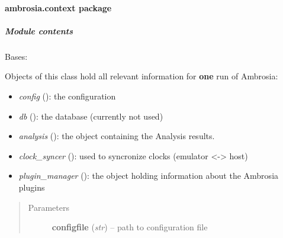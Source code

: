 \documentclass[letterpaper,10pt,english]{sphinxmanual}
\begin{document}
\paragraph{ambrosia.context package}
\label{ambrosia.context::doc}\label{ambrosia.context:ambrosia-context-package}

\subparagraph{Module contents}
\label{ambrosia.context:module-ambrosia.context}\label{ambrosia.context:module-contents}

\begin{fulllineitems}
\label{ambrosia.context:ambrosia.context.AmbrosiaContext}
Bases: 

Objects of this class hold all relevant information for \textbf{one} run of Ambrosia:
\begin{itemize}
\item {} 
\emph{config} (): the configuration

\item {} 
\emph{db} (): the database (currently not used)

\item {} 
\emph{analysis} (): the object containing the Analysis results.

\item {} 
\emph{clock\_syncer} (): used to syncronize clocks (emulator \textless{}-\textgreater{} host)

\item {} 
\emph{plugin\_manager} (): the object holding information about the Ambrosia
plugins

\end{itemize}
\begin{quote}\begin{description}
\item[{Parameters}] \leavevmode
\textbf{configfile} (\emph{str}) -- path to configuration file

\end{description}\end{quote}

\end{fulllineitems}
\end{document}
